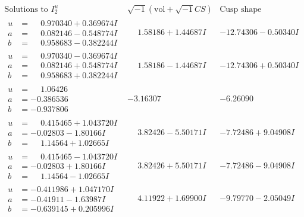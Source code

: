 \documentclass[1p]{elsarticle_modified}
\theoremstyle{definition}
\newcommand{\I}{\sqrt{-1}}
\begin{document}
$$\begin{array}{c|c|c}  
\text{Solutions to }I^u_{2}& \I (\text{vol} + \sqrt{-1}CS) & \text{Cusp shape}\\
 \hline 
\begin{aligned}
u &= \phantom{-}0.970340 + 0.369674 I \\
a &= \phantom{-}0.082146 - 0.548774 I \\
b &= \phantom{-}0.958683 - 0.382244 I\end{aligned}
 & \phantom{-}1.58186 + 1.44687 I & -12.74306 - 0.50340 I \\ \hline\begin{aligned}
u &= \phantom{-}0.970340 - 0.369674 I \\
a &= \phantom{-}0.082146 + 0.548774 I \\
b &= \phantom{-}0.958683 + 0.382244 I\end{aligned}
 & \phantom{-}1.58186 - 1.44687 I & -12.74306 + 0.50340 I \\ \hline\begin{aligned}
u &= \phantom{-}1.06426\phantom{ +0.000000I} \\
a &= -0.386536\phantom{ +0.000000I} \\
b &= -0.937806\phantom{ +0.000000I}\end{aligned}
 & -3.16307\phantom{ +0.000000I} & -6.26090\phantom{ +0.000000I} \\ \hline\begin{aligned}
u &= \phantom{-}0.415465 + 1.043720 I \\
a &= -0.02803 - 1.80166 I \\
b &= \phantom{-}1.14564 + 1.02665 I\end{aligned}
 & \phantom{-}3.82426 - 5.50171 I & -7.72486 + 9.04908 I \\ \hline\begin{aligned}
u &= \phantom{-}0.415465 - 1.043720 I \\
a &= -0.02803 + 1.80166 I \\
b &= \phantom{-}1.14564 - 1.02665 I\end{aligned}
 & \phantom{-}3.82426 + 5.50171 I & -7.72486 - 9.04908 I \\ \hline\begin{aligned}
u &= -0.411986 + 1.047170 I \\
a &= -0.41911 - 1.63987 I \\
b &= -0.639145 + 0.205996 I\end{aligned}
 & \phantom{-}4.11922 + 1.69900 I & -9.79770 - 2.05049 I \\ \hline\begin{aligned}

\end{aligned}
\end{array}$$
\end{document}
